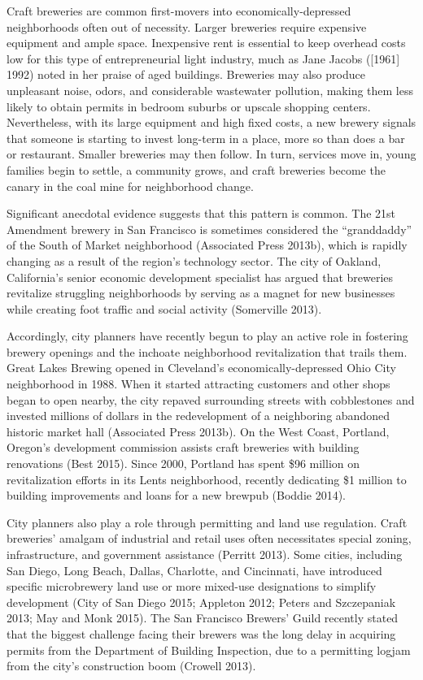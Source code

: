 \documentclass[]{article}
\begin{document}
Craft breweries are common first-movers into economically-depressed
neighborhoods often out of necessity. Larger breweries require expensive
equipment and ample space. Inexpensive rent is essential to keep
overhead costs low for this type of entrepreneurial light industry, much
as Jane Jacobs ({[}1961{]} 1992) noted in her praise of aged buildings.
Breweries may also produce unpleasant noise, odors, and considerable
wastewater pollution, making them less likely to obtain permits in
bedroom suburbs or upscale shopping centers. Nevertheless, with its
large equipment and high fixed costs, a new brewery signals that someone
is starting to invest long-term in a place, more so than does a bar or
restaurant. Smaller breweries may then follow. In turn, services move
in, young families begin to settle, a community grows, and craft
breweries become the canary in the coal mine for neighborhood change.

Significant anecdotal evidence suggests that this pattern is common. The
21st Amendment brewery in San Francisco is sometimes considered the
``granddaddy'' of the South of Market neighborhood (Associated Press
2013b), which is rapidly changing as a result of the region's technology
sector. The city of Oakland, California's senior economic development
specialist has argued that breweries revitalize struggling neighborhoods
by serving as a magnet for new businesses while creating foot traffic
and social activity (Somerville 2013).

Accordingly, city planners have recently begun to play an active role in
fostering brewery openings and the inchoate neighborhood revitalization
that trails them. Great Lakes Brewing opened in Cleveland's
economically-depressed Ohio City neighborhood in 1988. When it started
attracting customers and other shops began to open nearby, the city
repaved surrounding streets with cobblestones and invested millions of
dollars in the redevelopment of a neighboring abandoned historic market
hall (Associated Press 2013b). On the West Coast, Portland, Oregon's
development commission assists craft breweries with building renovations
(Best 2015). Since 2000, Portland has spent \$96 million on
revitalization efforts in its Lents neighborhood, recently dedicating
\$1 million to building improvements and loans for a new brewpub (Boddie
2014).

City planners also play a role through permitting and land use
regulation. Craft breweries' amalgam of industrial and retail uses often
necessitates special zoning, infrastructure, and government assistance
(Perritt 2013). Some cities, including San Diego, Long Beach, Dallas,
Charlotte, and Cincinnati, have introduced specific microbrewery land
use or more mixed-use designations to simplify development (City of San
Diego 2015; Appleton 2012; Peters and Szczepaniak 2013; May and Monk
2015). The San Francisco Brewers' Guild recently stated that the biggest
challenge facing their brewers was the long delay in acquiring permits
from the Department of Building Inspection, due to a permitting logjam
from the city's construction boom (Crowell 2013).
\end{document}
